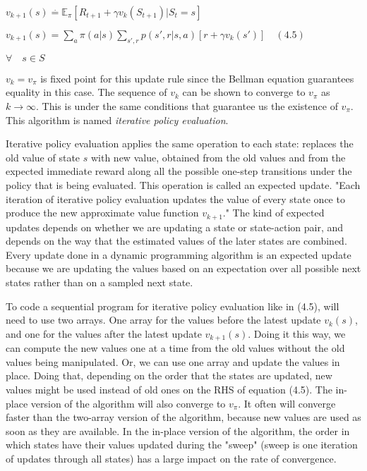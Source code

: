 \documentclass[11pt]{article}
\begin{document}
\(v_{k+1}(s) \stackrel{.}{=} \mathbb{E}_\pi[R_{t+1} + \gamma v_k (S_{t+1}) | S_t = s]\)

\(v_{k+1}(s) = \sum_{a} \pi(a|s) \sum_{s', r} p(s', r | s, a)[r + \gamma v_k(s')] \quad (4.5)\)

\(\forall \quad s \in S\)

\(v_k = v_\pi\) is fixed point for this update rule since the Bellman
equation guarantees equality in this case. The sequence of \({v_k}\) can
be shown to converge to \(v_\pi\) as \(k \rightarrow \infty\). This is
under the same conditions that guarantee us the existence of \(v_\pi\).
This algorithm is named \emph{iterative policy evaluation}.

Iterative policy evaluation applies the same operation to each state:
replaces the old value of state \(s\) with new value, obtained from the
old values and from the expected immediate reward along all the possible
one-step transitions under the policy that is being evaluated. This
operation is called an expected update. "Each iteration of iterative
policy evaluation updates the value of every state once to produce the
new approximate value function \(v_{k+1}\)." The kind of expected
updates depends on whether we are updating a state or state-action pair,
and depends on the way that the estimated values of the later states are
combined. Every update done in a dynamic programming algorithm is an
expected update because we are updating the values based on an
expectation over all possible next states rather than on a sampled next
state.

To code a sequential program for iterative policy evaluation like in
(4.5), will need to use two arrays. One array for the values before the
latest update \({v_k(s)}\), and one for the values after the latest
update \({v_{k+1}(s)}\). Doing it this way, we can compute the new
values one at a time from the old values without the old values being
manipulated. Or, we can use one array and update the values in place.
Doing that, depending on the order that the states are updated, new
values might be used instead of old ones on the RHS of equation (4.5).
The in-place version of the algorithm will also converge to \(v_\pi\).
It often will converge faster than the two-array version of the
algorithm, because new values are used as soon as they are available. In
the in-place version of the algorithm, the order in which states have
their values updated during the "sweep" (sweep is one iteration of
updates through all states) has a large impact on the rate of
convergence.
\end{document}
